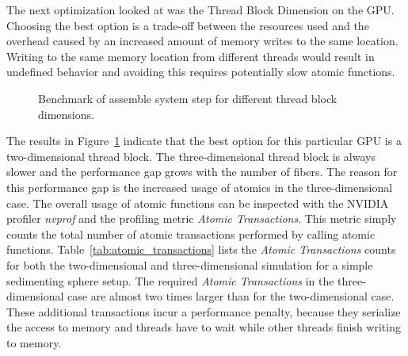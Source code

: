 The next optimization looked at was the Thread Block Dimension on the GPU. Choosing the best option is a trade-off between the resources used and the overhead caused by an increased amount of memory writes to the same location. Writing to the same memory location from different threads would result in undefined behavior and avoiding this requires potentially slow atomic functions.

\begin{figure}[!htbp]
  \centering
  \caption{Benchmark of assemble system step for different thread block dimensions.}
  \label{fig:bench_cuda_thread_blocks}
\end{figure}

The results in Figure~\ref{fig:bench_cuda_thread_blocks} indicate that the best option for this particular GPU is a two-dimensional thread block. The three-dimensional thread block is always slower and the performance gap grows with the number of fibers. The reason for this performance gap is the increased usage of atomics in the three-dimensional case. The overall usage of atomic functions can be inspected with the NVIDIA profiler \emph{nvprof} and the profiling metric \emph{Atomic Transactions}. This metric simply counts the total number of atomic transactions performed by calling atomic functions. Table~\ref{tab:atomic_transactions} lists the \emph{Atomic Transactions} counts for both the two-dimensional and three-dimensional simulation for a simple sedimenting sphere setup. The required \emph{Atomic Transactions} in the three-dimensional case are almost two times larger than for the two-dimensional case. These additional transactions incur a performance penalty, because they serialize the access to memory and threads have to wait while other threads finish writing to memory.

